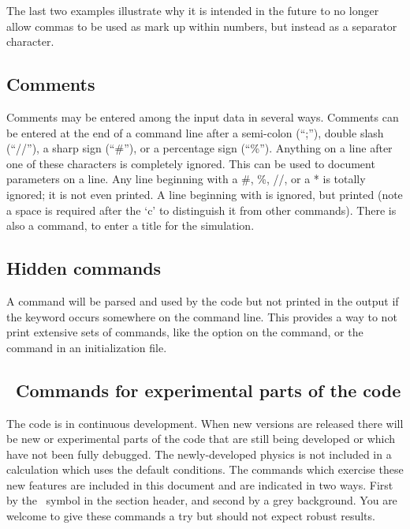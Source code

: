 The last two examples illustrate why it is intended in the future to
no longer allow commas to be used as mark up within numbers, but
instead as a separator character.

\subsection{Comments}
\label{sec:CommentsInInput}

Comments may be entered among the input data in several ways.
Comments
can be entered at the end of a command line after a semi-colon (``;''),
double slash (``//''), a sharp sign (``\#''), or a percentage sign (``\%'').
Anything on a line after one of these characters is completely ignored.
This can be used to document parameters on a line.
Any line beginning with
a \#, \%, //, or a * is totally ignored; it is not even printed.
A line
beginning with  is ignored, but printed (note a space is required after the `c' to distinguish it from other commands).
There is also a  command, to enter a title for the simulation.

\subsection{Hidden commands}

A command will be parsed and used by the code but not printed in the
output if the keyword  occurs somewhere on the command line.
This
provides a way to not print extensive sets of commands, like the
option on the  command,
or the  command in an initialization file.

\begin{shaded}
\subsection{\experimental\ Commands for experimental parts of the code}

The code is in continuous development. When new versions are released there
will be new or experimental parts of the code that are still being developed
or which have not been fully debugged. The newly-developed physics is not
included in a calculation which uses the default conditions.
The commands
which exercise these new features are included in this document
and are indicated in two ways.
First by the \experimental\ symbol in the section
header, and second by a grey background. You are welcome to give these
commands a try but should not expect robust results.
\end{shaded}

